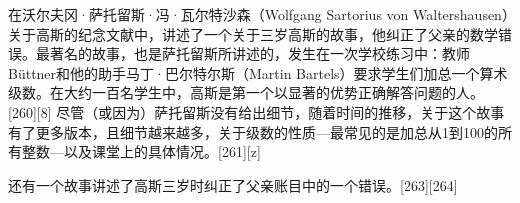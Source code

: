 在沃尔夫冈·萨托留斯·冯·瓦尔特沙森（Wolfgang Sartorius von Waltershausen）关于高斯的纪念文献中，讲述了一个关于三岁高斯的故事，他纠正了父亲的数学错误。最著名的故事，也是萨托留斯所讲述的，发生在一次学校练习中：教师Büttner和他的助手马丁·巴尔特尔斯（Martin Bartels）要求学生们加总一个算术级数。在大约一百名学生中，高斯是第一个以显著的优势正确解答问题的人。[260][8] 尽管（或因为）萨托留斯没有给出细节，随着时间的推移，关于这个故事有了更多版本，且细节越来越多，关于级数的性质—最常见的是加总从1到100的所有整数—以及课堂上的具体情况。[261][z]

还有一个故事讲述了高斯三岁时纠正了父亲账目中的一个错误。[263][264]